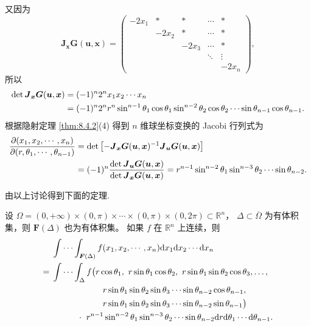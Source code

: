 又因为
\[
\boldsymbol{J}_{\boldsymbol{x}}\boldsymbol{G}(\boldsymbol{u}, \boldsymbol{x}) =
\begin{pmatrix}
-2x_1 & * & * & \cdots & *\\
  & -2x_2 & * & \cdots & *\\
  &  & -2x_3 & \cdots & *\\
  &  &  & \ddots & \vdots\\
  &  &  &  & -2x_n
\end{pmatrix},
\]
所以
\begin{align*}
\det \boldsymbol{J}_{\boldsymbol{x}}\boldsymbol{G}(\boldsymbol{u}, \boldsymbol{x})
&= (-1)^n 2^n x_1 x_2 \cdots x_n \notag\\
&= (-1)^n 2^n r^{n} \sin^{n-1}\theta_1 \cos\theta_1 \sin^{n-2}\theta_2 \cos\theta_2
   \cdots \sin\theta_{n-1} \cos\theta_{n-1}. \notag
\end{align*}
根据隐射定理 \ref{thm:8.4.2}(4) 得到 $n$ 维球坐标变换的 Jacobi 行列式为
\begin{align*}
\frac{\partial(x_1, x_2, \cdots, x_n)}{\partial(r, \theta_1, \cdots, \theta_{n-1})}
&= \det\left[ -\boldsymbol{J}_{\boldsymbol{x}}\boldsymbol{G}(\boldsymbol{u}, \boldsymbol{x})^{-1}
              \boldsymbol{J}_{\boldsymbol{u}}\boldsymbol{G}(\boldsymbol{u}, \boldsymbol{x}) \right] \notag\\
&= (-1)^n \frac{\det \boldsymbol{J}_{\boldsymbol{u}}\boldsymbol{G}(\boldsymbol{u}, \boldsymbol{x})}
           {\det \boldsymbol{J}_{\boldsymbol{x}}\boldsymbol{G}(\boldsymbol{u}, \boldsymbol{x})}
 = r^{n-1} \sin^{n-2}\theta_1 \sin^{n-3}\theta_2 \cdots \sin\theta_{n-2}. \notag
\end{align*}

由以上讨论得到下面的定理.

\begin{theorem}[$n$ 重积分球坐标换元公式]\label{thm:10.5.6}
设 $\Omega = (0, +\infty) \times (0, \pi) \times \cdots \times (0, \pi) \times (0, 2\pi) \subset \mathbb{R}^n$，
$\Delta \subset \overline{\Omega}$ 为有体积集，则 $\boldsymbol{F}(\Delta)$ 也为有体积集。
如果 $f$ 在 $\mathbb{R}^n$ 上连续，则
\begin{align*}
&\idotsint _{\boldsymbol{F}(\Delta)}
  f(x_1, x_2, \cdots, x_n) \mathrm{d}x_1 \mathrm{d}x_2 \cdots \mathrm{d}x_n \notag\\
={}&\idotsint _{\Delta} f\bigl(
  r\cos\theta_1,\ r\sin\theta_1 \cos\theta_2,\ r\sin\theta_1 \sin\theta_2 \cos\theta_3, \ldots, \notag\\
&\hspace{60pt}
  r\sin\theta_1 \sin\theta_2 \sin\theta_3 \cdots \sin\theta_{n-2} \cos\theta_{n-1}, \notag\\
&\hspace{60pt}
  r\sin\theta_1 \sin\theta_2 \sin\theta_3 \cdots \sin\theta_{n-2} \sin\theta_{n-1}\bigr) \notag\\
&\hspace{30pt}\cdot\ r^{n-1} \sin^{n-2}\theta_1 \sin^{n-3}\theta_2 \cdots \sin\theta_{n-2}
  \mathrm{d}r \mathrm{d}\theta_1 \cdots \mathrm{d}\theta_{n-1}. \notag
\end{align*}
\end{theorem}

